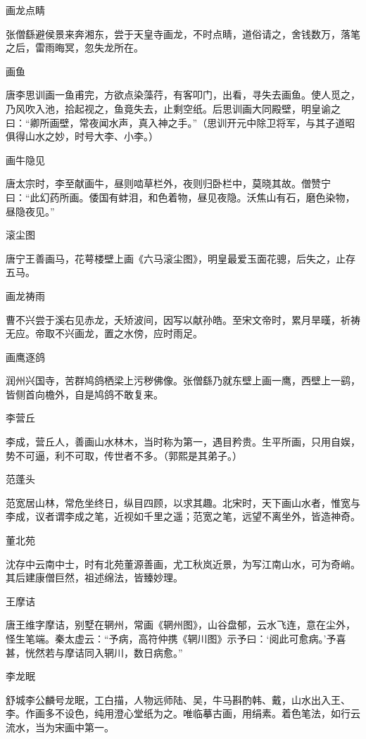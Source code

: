 \documentclass[a4paper,12pt,UTF8,twoside]{ctexbook}
\begin{document}
    画龙点睛
    
    张僧繇避侯景来奔湘东，尝于天皇寺画龙，不时点睛，道俗请之，舍钱数万，落笔之后，雷雨晦冥，忽失龙所在。
    
    画鱼
    
    唐李思训画一鱼甫完，方欲点染藻荇，有客叩门，出看，寻失去画鱼。使人觅之，乃风吹入池，拾起视之，鱼竟失去，止剩空纸。后思训画大同殿壁，明皇谕之曰：“卿所画壁，常夜闻水声，真入神之手。”（思训开元中除卫将军，与其子道昭俱得山水之妙，时号大李、小李。）
    
    画牛隐见
    
    唐太宗时，李至献画牛，昼则啮草栏外，夜则归卧栏中，莫晓其故。僧赞宁曰：“此幻药所画。倭国有蚌泪，和色着物，昼见夜隐。沃焦山有石，磨色染物，昼隐夜见。”
    
    滚尘图
    
    唐宁王善画马，花萼楼壁上画《六马滚尘图》，明皇最爱玉面花骢，后失之，止存五马。
    
    画龙祷雨
    
    曹不兴尝于溪右见赤龙，夭矫波间，因写以献孙皓。至宋文帝时，累月旱暵，祈祷无应。帝取不兴画龙，置之水傍，应时雨足。
    
    画鹰逐鸽
    
    润州兴国寺，苦群鸠鸽栖梁上污秽佛像。张僧繇乃就东壁上画一鹰，西壁上一鹞，皆侧首向檐外，自是鸠鸽不敢复来。
    
    李营丘
    
    李成，营丘人，善画山水林木，当时称为第一，遇目矜贵。生平所画，只用自娱，势不可逼，利不可取，传世者不多。（郭熙是其弟子。）
    
    范蓬头
    
    范宽居山林，常危坐终日，纵目四顾，以求其趣。北宋时，天下画山水者，惟宽与李成，议者谓李成之笔，近视如千里之遥；范宽之笔，远望不离坐外，皆造神奇。
    
    董北苑
    
    沈存中云南中士，时有北苑董源善画，尤工秋岚近景，为写江南山水，可为奇峭。其后建康僧巨然，祖述绵法，皆臻妙理。
    
    王摩诘
    
    唐王维字摩诘，别墅在辋州，常画《辋州图》，山谷盘郁，云水飞连，意在尘外，怪生笔端。秦太虚云：“予病，高符仲携《辋川图》示予曰：‘阅此可愈病。’予喜甚，恍然若与摩诘同入辋川，数日病愈。”
    
    李龙眠
    
    舒城李公麟号龙眠，工白描，人物远师陆、吴，牛马斟酌韩、戴，山水出入王、李。作画多不设色，纯用澄心堂纸为之。唯临摹古画，用绢素。着色笔法，如行云流水，当为宋画中第一。
    
\end{document}
